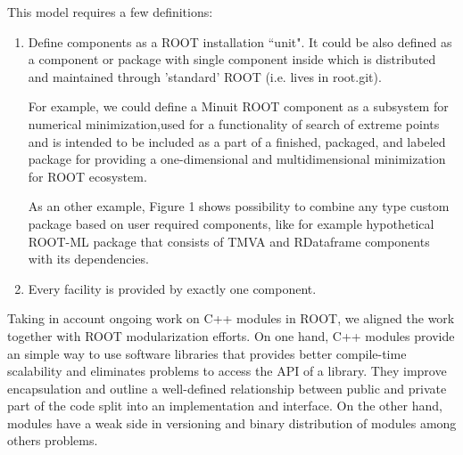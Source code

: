 \documentclass{webofc}
\begin{document}
This model requires a few definitions:
\begin{enumerate}
\item Define components as a ROOT installation “unit". It could be also defined as a component or package with single component inside which is distributed and maintained through 'standard' ROOT (i.e. lives in root.git). \cite{rootgit}

For example, we could define a Minuit ROOT component as a subsystem for numerical minimization,used for a functionality of search of extreme points and is intended to be included as a part of a finished, packaged, and labeled package for providing a one-dimensional and multidimensional minimization for ROOT ecosystem.

As an other example, Figure 1 shows possibility to combine any type custom package based on user required components, like for example hypothetical ROOT-ML package that consists of TMVA and RDataframe components with its dependencies.

\item Every facility is provided by exactly one component.
\end{enumerate}

Taking in account ongoing work on C++ modules \cite{rootcxxmodules} in ROOT, we aligned the work together with ROOT modularization efforts. On one hand, C++ modules provide an simple way to use software libraries that provides better compile-time scalability and eliminates problems to access the API of a library. They improve encapsulation and outline a well-defined relationship between public and private part of the code split into an implementation and interface. On the other hand, modules have a weak side in versioning and binary distribution of modules among others problems.

\end{document}
